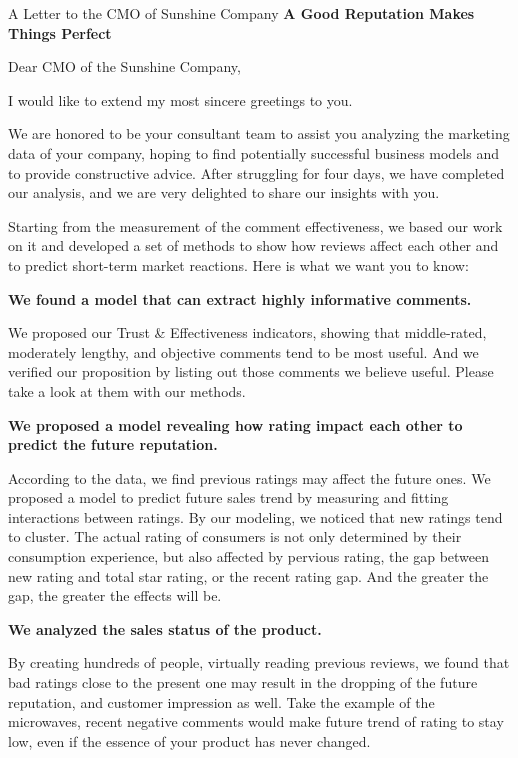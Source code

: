 \documentclass[12pt]{article}  %
\begin{document}
 \begin{letter}{A Letter to the CMO of Sunshine Company}
   \noindent
   \textbf{\Large A Good Reputation Makes Things Perfect}
   
\noindent
Dear CMO of the Sunshine Company,

​I would like to extend my most sincere greetings to you.

​We are honored to be your consultant team to assist you analyzing the marketing data of your company, hoping to find potentially successful business models and to provide constructive advice. After struggling for four days, we have completed our analysis, and we are very delighted to share our insights with you.

​Starting from the measurement of the comment effectiveness, we based our work on it and developed a set of methods to show how reviews affect each other and to predict short-term market reactions. Here is what we want you to know:

\noindent
\textbf{We ​found a model that can extract highly informative comments.}

    We proposed our Trust \& Effectiveness indicators, showing that middle-rated, moderately lengthy, and objective comments tend to be most useful. And we verified our proposition by listing out those comments we believe useful. Please take a look at them with our methods.

\noindent
\textbf{We proposed a model revealing how rating impact each other to predict the future reputation.}
    
    According to the data, we find previous ratings may affect the future ones. We proposed a model to predict future sales trend by measuring and fitting interactions between ratings. By our modeling, we noticed that new ratings tend to cluster. The actual rating of consumers is not only determined by their consumption experience, but also affected by pervious rating, the gap between new rating and total star rating, or the recent rating gap. And the greater the gap, the greater the effects will be.

\noindent
\textbf{We analyzed the sales status of the product.}
    
By creating hundreds of people, virtually reading previous reviews, we found that bad ratings close to the present one may result in the dropping of the future reputation, and customer impression as well. Take the example of the microwaves, recent negative comments would make future trend of rating to stay low, even if the essence of your product has never changed.


\end{letter}
\end{document}
